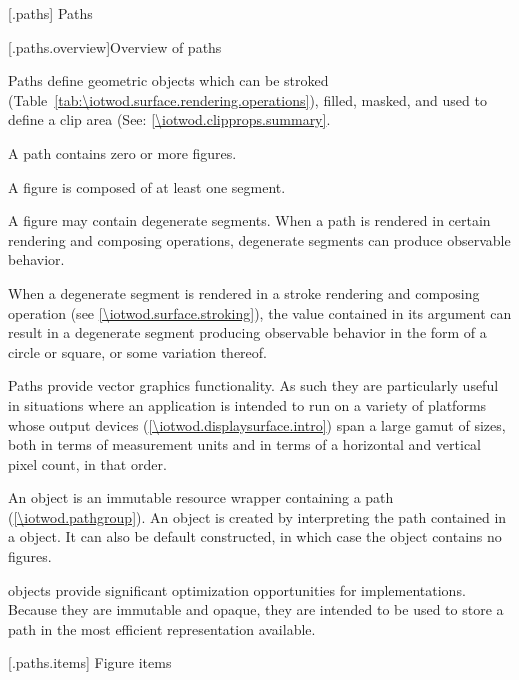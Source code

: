 
 [\iotwod.paths] {Paths}

 [\iotwod.paths.overview]{Overview of paths}

\pnum
Paths define geometric objects which can be stroked (Table~\ref{tab:\iotwod.surface.rendering.operations}), filled, masked, and used to define a clip area (See: \ref{\iotwod.clipprops.summary}.

\pnum
A path contains zero or more figures.

\pnum
A figure is composed of at least one segment.

\pnum
A figure may contain degenerate segments. When a path is rendered in certain rendering and composing operations, degenerate segments can produce observable behavior.
\begin{example}
When a degenerate segment is rendered in a stroke rendering and composing operation (see \ref{\iotwod.surface.stroking}), the  value contained in its  argument can result in a degenerate segment producing observable behavior in the form of a circle or square, or some variation thereof.
\end{example}

\pnum
Paths provide vector graphics functionality. As such they are particularly useful in situations where an application is intended to run on a variety of platforms whose output devices (\ref{\iotwod.displaysurface.intro}) span a large gamut of sizes, both in terms of measurement units and in terms of a horizontal and vertical pixel count, in that order.

\pnum
An  object is an immutable resource wrapper containing a path (\ref{\iotwod.pathgroup}). An  object is created by interpreting the path contained in a  object. It can also be default constructed, in which case the  object contains no figures.
\begin{note}
 objects provide significant optimization opportunities for implementations. Because they are immutable and opaque, they are intended to be used to store a path in the most efficient representation available.
\end{note}



 [\iotwod.paths.items] {Figure items}

\addtocounter{SectionDepthBase}{2}















\addtocounter{SectionDepthBase}{-2}

\addtocounter{SectionDepthBase}{1}


\addtocounter{SectionDepthBase}{-1}
